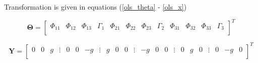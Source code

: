 Transformation is given in equations (\ref{ols_theta} - \ref{ols_x})
\setcounter{MaxMatrixCols}{25}

\begin{equation}
	\bm{\Theta} = \begin{bmatrix} \Phi_{11} & \Phi_{12} & \Phi_{13} & \Gamma_1 & \Phi_{21} & \Phi_{22} & \Phi_{23} & \Gamma_2 & \Phi_{31} & \Phi_{32} & \Phi_{33} & \Gamma_3 \\
	\end{bmatrix}^T
	\label{ols_theta}
\end{equation}


\begin{equation}
	\bm{Y} = \begin{bmatrix} 0 & 0 & g & \vdots & 0 & 0 & -g & \vdots & g & 0 & 0 & \vdots & -g & 0 & 0  & \vdots& 0 & g & 0 & \vdots & 0 & -g & 0 \\
	\end{bmatrix}^T
	\label{ols_y}
\end{equation}

